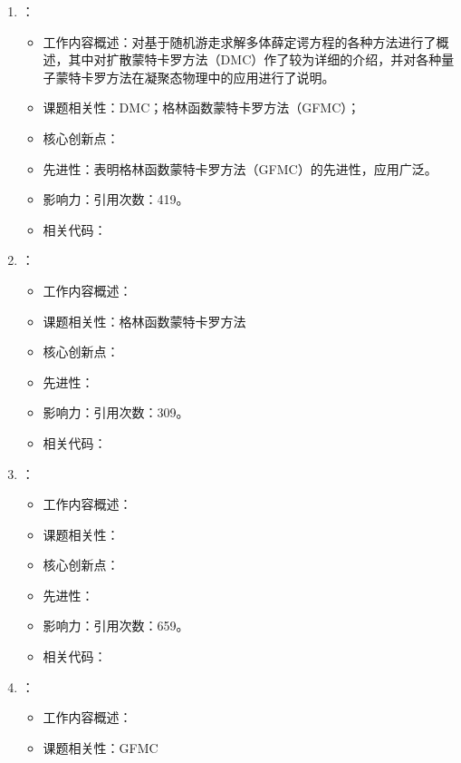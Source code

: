 \begin{enumerate}
\begin{itemize}
        \end{itemize}
        \item \citet{ceperley1986quantum}：
            \begin{itemize}
                \item 工作内容概述：对基于随机游走求解多体薛定谔方程的各种方法进行了概述，其中对扩散蒙特卡罗方法（DMC）作了较为详细的介绍，并对各种量子蒙特卡罗方法在凝聚态物理中的应用进行了说明。
                \item 课题相关性：DMC；格林函数蒙特卡罗方法（GFMC）；
                \item 核心创新点：
                \item 先进性：表明格林函数蒙特卡罗方法（GFMC）的先进性，应用广泛。
                \item 影响力：引用次数：419。
                \item 相关代码：
            \end{itemize}
        \item \citet{trivedi1990ground}：
            \begin{itemize}
                \item 工作内容概述：
                \item 课题相关性：格林函数蒙特卡罗方法
                \item 核心创新点：
                \item 先进性：
                \item 影响力：引用次数：309。
                \item 相关代码：
            \end{itemize}
        \item \citet{umrigar1993diffusion}：
            \begin{itemize}
                \item 工作内容概述：
                \item 课题相关性：
                \item 核心创新点：
                \item 先进性：
                \item 影响力：引用次数：659。
                \item 相关代码：
            \end{itemize}
            \item \citet{buonaura1998numerical}：
            \begin{itemize}
                \item 工作内容概述：
                \item 课题相关性：GFMC

\end{itemize}
\end{enumerate}
